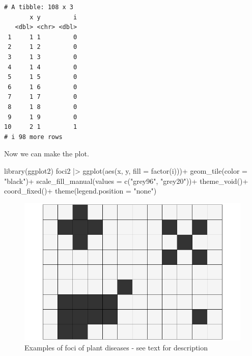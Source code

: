 \documentclass[
  letterpaper,
  DIV=11,
  numbers=noendperiod]{scrreprt}
\newenvironment{Shaded}{\begin{snugshade}}{\end{snugshade}}
\newcommand{\AttributeTok}[1]{\textcolor[rgb]{0.40,0.45,0.13}{#1}}
\newcommand{\FunctionTok}[1]{\textcolor[rgb]{0.28,0.35,0.67}{#1}}
\newcommand{\NormalTok}[1]{\textcolor[rgb]{0.00,0.23,0.31}{#1}}
\newcommand{\SpecialCharTok}[1]{\textcolor[rgb]{0.37,0.37,0.37}{#1}}
\newcommand{\StringTok}[1]{\textcolor[rgb]{0.13,0.47,0.30}{#1}}
\begin{document}
\begin{verbatim}
# A tibble: 108 x 3
       x y         i
   <dbl> <chr> <dbl>
 1     1 1         0
 2     1 2         0
 3     1 3         0
 4     1 4         0
 5     1 5         0
 6     1 6         0
 7     1 7         0
 8     1 8         0
 9     1 9         0
10     2 1         1
# i 98 more rows
\end{verbatim}

Now we can make the plot.

\begin{Shaded}
\begin{Highlighting}[]
\FunctionTok{library}\NormalTok{(ggplot2)}
\NormalTok{foci2 }\SpecialCharTok{|\textgreater{}} 
  \FunctionTok{ggplot}\NormalTok{(}\FunctionTok{aes}\NormalTok{(x, y, }\AttributeTok{fill =} \FunctionTok{factor}\NormalTok{(i)))}\SpecialCharTok{+}
  \FunctionTok{geom\_tile}\NormalTok{(}\AttributeTok{color =} \StringTok{"black"}\NormalTok{)}\SpecialCharTok{+}
  \FunctionTok{scale\_fill\_manual}\NormalTok{(}\AttributeTok{values =} \FunctionTok{c}\NormalTok{(}\StringTok{"grey96"}\NormalTok{, }\StringTok{"grey20"}\NormalTok{))}\SpecialCharTok{+}
  \FunctionTok{theme\_void}\NormalTok{()}\SpecialCharTok{+}
  \FunctionTok{coord\_fixed}\NormalTok{()}\SpecialCharTok{+}
  \FunctionTok{theme}\NormalTok{(}\AttributeTok{legend.position =} \StringTok{"none"}\NormalTok{)}
\end{Highlighting}
\end{Shaded}

\begin{figure}[H]

{\centering \includegraphics{spatial-tests_files/figure-pdf/fig-foci1-1.pdf}

}

\caption{\label{fig-foci1}Examples of foci of plant diseases - see text
for description}

\end{figure}
\end{document}
